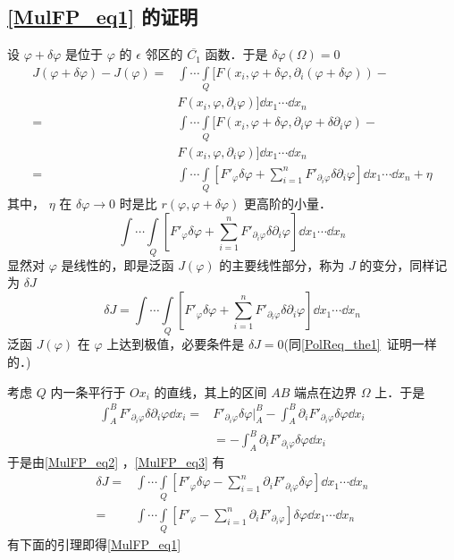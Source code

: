 \subsection{\autoref{MulFP_eq1} 的证明}
设 $\varphi+\delta\varphi$ 是位于 $\varphi$ 的 $\epsilon$ 邻区的 $\overline{C_1}$ 函数．于是 $\delta{\varphi}(\Omega)=0$
\begin{equation}
\begin{aligned}
J(\varphi+\delta\varphi)-J(\varphi)=&\int\cdots\int\limits_Q [F(x_i,\varphi+\delta\varphi,\partial_i(\varphi+\delta\varphi))-\\
&F(x_i,\varphi,\partial_i\varphi)]\dd x_1\cdots\dd x_n\\
=&\int\cdots\int\limits_Q [F(x_i,\varphi+\delta\varphi,\partial_i\varphi+\delta\partial_i\varphi)-\\
&F(x_i,\varphi,\partial_i\varphi)]\dd x_1\cdots\dd x_n\\
=&\int\cdots\int\limits_Q [F'_\varphi\delta\varphi+\sum_{i=1}^nF'_{\partial_i\varphi}\delta\partial_i\varphi]\dd x_1\cdots\dd x_n+\eta
\end{aligned}
\end{equation}
其中， $\eta$ 在 $\delta\varphi\rightarrow0$ 时是比 $r(\varphi,\varphi+\delta\varphi)$ 更高阶的小量．
\begin{equation}
\int\cdots\int\limits_Q [F'_\varphi\delta\varphi+\sum_{i=1}^nF'_{\partial_i\varphi}\delta\partial_i\varphi]\dd x_1\cdots\dd x_n
\end{equation}
显然对 $\varphi$ 是线性的，即是泛函 $J(\varphi)$ 的主要线性部分，称为 $J$ 的变分，同样记为 $\delta J$
\begin{equation}\label{MulFP_eq2}
\delta J=\int\cdots\int\limits_Q [F'_\varphi\delta\varphi+\sum_{i=1}^nF'_{\partial_i\varphi}\delta\partial_i\varphi]\dd x_1\cdots\dd x_n
\end{equation}
泛函 $J(\varphi)$ 在 $\varphi$ 上达到极值，必要条件是 $\delta J=0$(同\autoref{PolReq_the1}~证明一样的．)

考虑 $Q$ 内一条平行于 $Ox_i$ 的直线，其上的区间 $AB$ 端点在边界 $\Omega$ 上．于是
\begin{equation}\label{MulFP_eq3}
\begin{aligned}
\int_A^B F'_{\partial_i\varphi}\delta\partial_i\varphi\dd x_i=&F'_{\partial_i\varphi}\delta\varphi\Big|_A^B-\int_A^B \partial_iF'_{\partial_i\varphi}\delta\varphi\dd x_i\\
&=-\int_A^B \partial_iF'_{\partial_i\varphi}\delta\varphi\dd x_i
\end{aligned}
\end{equation}
于是由\autoref{MulFP_eq2} ，\autoref{MulFP_eq3} 有
\begin{equation}
\begin{aligned}
\delta J=&\int\cdots\int\limits_Q [F'_\varphi\delta\varphi-\sum_{i=1}^n\partial_iF'_{\partial_i\varphi}\delta\varphi]\dd x_1\cdots\dd x_n\\
=&\int\cdots\int\limits_Q [F'_\varphi-\sum_{i=1}^n\partial_iF'_{\partial_i\varphi}]\delta\varphi\dd x_1\cdots\dd x_n
\end{aligned}
\end{equation}
有下面的引理即得\autoref{MulFP_eq1} 

